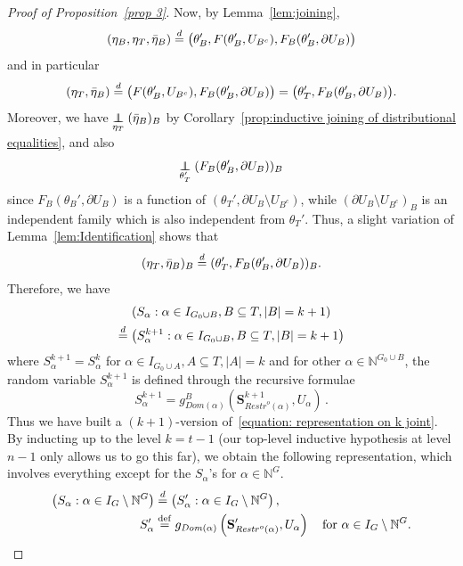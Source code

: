 \documentclass[10pt]{amsart}
\theoremstyle{definition}\newtheorem{defi}[theo]{Definition}\newtheorem{rema}[theo]{Remark}\newtheorem{exam}[theo]{Example}\newtheorem{exem}[theo]{Example}\newtheorem{nota}[theo]{Notation}
\newcommand{\independent}{\protect\mathpalette{\protect\independenT}{\perp}}\def\independenT#1#2{\mathrel{\rlap{$#1#2$}\mkern2mu{#1#2}}}
\newcommand{\alf}{\alpha}%
\newcommand*{\defeq}{\stackrel{\mathrm{def}}{=}}
\newcommand{\indices}[1]{\mathbb{N}^{#1}}
\renewcommand{\d}{\buildrel{d}\over{=}}
\newcommand*\srstr{\mathit{Restr}^o}
\newcommand*\dom{\mathit{Dom}}
\newcommand*\N{\mathbb{N}}
\newcommand*\bS{\mathbf{S}}
\begin{document}
\begin{proof}[Proof of Proposition~\ref{prop 3}]
Now, by Lemma~\ref{lem:joining},
\[
(\eta_B,\eta_T,\bar\eta_B) \d \big(\theta_B', F(\theta_B',U_{B^c}), F_B(\theta_B',\partial U_B)\big)
\]
and in particular
\[
(\eta_T, \bar\eta_B) \d \big(F(\theta_B',U_{B^c}), F_B(\theta_B',\partial U_B)\big)=\big(\theta_T', F_B(\theta_B',\partial U_B)\big).
\]
Moreover, we have $\underset{\eta_T}{\independent}(\bar\eta_B)_B$ by Corollary~\ref{prop:inductive joining of distributional equalities}, and also
\[
\underset{\theta_T'}{\independent}(F_B(\theta_B', \partial U_B))_B
\]
since $F_B(\theta_B',\partial U_B)$ is a function of $(\theta_T', \partial U_B \setminus U_{B^c})$, while $(\partial U_B \setminus U_{B^c})_B$ is an independent family which is also independent from $\theta_T'$. Thus, a slight variation of Lemma~\ref{lem:Identification} shows that
\[
(\eta_T, \bar\eta_B)_B \d (\theta_T', F_B(\theta_B', \partial U_B))_B.
\]
Therefore, we have
\begin{multline}\label{equation: representation on k+1 joint}
\left(S_\alf :{\alf \in I_{G_0 \cup B}}, B \subseteq T, |B|=k+1\right) \\
\d \left({S_\alf ^{k+1}}: \alf \in I_{G_0 \cup B}, B \subseteq T, |B|=k+1\right)
\end{multline}
where ${S_\alf ^{k+1}}=S^k_\alf $ for $\alf \in I_{G_0 \cup A}, A \subseteq T, |A|=k$ and for other $\alf \in \indices {G_0 \cup B}$, the random variable ${S_\alf ^{k+1}}$ is defined through the recursive formulae
\[
{S_\alf ^{k+1}}=g^B_{\dom(\alf)}\left({\bS^{k+1}_{\srstr(\alf)}}, U_\alf\right)\,.
\]
Thus we have built a $(k+1)$-version of~\eqref{equation: representation on k joint}. By inducting up to the level $k=t-1$ (our top-level inductive hypothesis at level $n-1$ only allows us to go this far), we obtain the following representation, which involves everything except for the $S_\alf$'s for $\alf \in \N^G$.
\begin{equation}\label{equation: representation on t-1}
\begin{aligned}
\left(S_\alf :{\alf \in I_G\setminus \N^G}\right) & \d \left(S'_\alf : {\alf \in I_G\setminus \N^G}\right),
\\
S'_\alf &
\defeq g_{\dom(\alf)}\left(\bS'_{\srstr(\alf)}, U_\alf\right)
\quad\text{for } \alf \in { I_G\setminus \N^G}.
\end{aligned}
\end{equation}



\end{proof}
\end{document}
